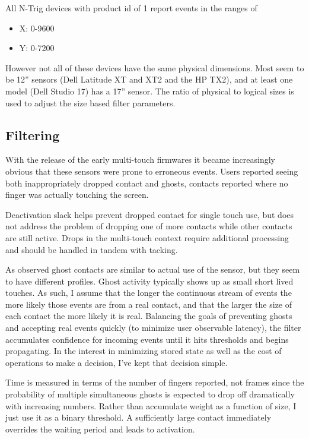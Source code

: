 \documentclass[a4paper,8pt,english]{sphinxmanual}
\begin{document}
All N-Trig devices with product id of 1 report events in the ranges of
\begin{itemize}
\item {} 
X: 0-9600

\item {} 
Y: 0-7200

\end{itemize}

However not all of these devices have the same physical dimensions.  Most
seem to be 12'' sensors (Dell Latitude XT and XT2 and the HP TX2), and
at least one model (Dell Studio 17) has a 17'' sensor.  The ratio of physical
to logical sizes is used to adjust the size based filter parameters.


\subsection{Filtering}
\label{input/devices/ntrig:filtering}
With the release of the early multi-touch firmwares it became increasingly
obvious that these sensors were prone to erroneous events.  Users reported
seeing both inappropriately dropped contact and ghosts, contacts reported
where no finger was actually touching the screen.

Deactivation slack helps prevent dropped contact for single touch use, but does
not address the problem of dropping one of more contacts while other contacts
are still active.  Drops in the multi-touch context require additional
processing and should be handled in tandem with tacking.

As observed ghost contacts are similar to actual use of the sensor, but they
seem to have different profiles.  Ghost activity typically shows up as small
short lived touches.  As such, I assume that the longer the continuous stream
of events the more likely those events are from a real contact, and that the
larger the size of each contact the more likely it is real.  Balancing the
goals of preventing ghosts and accepting real events quickly (to minimize
user observable latency), the filter accumulates confidence for incoming
events until it hits thresholds and begins propagating.  In the interest in
minimizing stored state as well as the cost of operations to make a decision,
I've kept that decision simple.

Time is measured in terms of the number of fingers reported, not frames since
the probability of multiple simultaneous ghosts is expected to drop off
dramatically with increasing numbers.  Rather than accumulate weight as a
function of size, I just use it as a binary threshold.  A sufficiently large
contact immediately overrides the waiting period and leads to activation.
\end{document}
